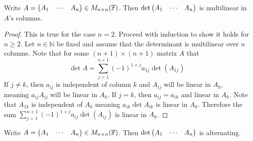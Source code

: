 \documentclass[../notes.tex]{subfiles}
\begin{document}
\begin{theorem}
    \label{thm:mlineardeterminant}
    Write $A = \mqty(A_1 & \cdots & A_n) \in M_{n\times n}(\mathbb{F})$. Then $\det \mqty(A_1 & \cdots & A_n)$ is multilinear in $A$'s columns.
\end{theorem}

\begin{proof}
    This is true for the case $n = 2$. Proceed with induction to show it holds for $n \geq 2$. Let $n \in \mathbb{N}$ be fixed and assume that the determinant is multilinear over $n$ columns. Note that for some $(n+1) \times (n+1)$ matrix $A$ that
    \[
        \det A = \sum_{j = 1}^{n+1} (-1)^{1 + j} a_{1j} \det(A_{1j})
    \]
    If $j \neq k$, then $a_{ij}$ is independent of column $k$ and $A_{ij}$ will be linear in $A_k$, meaning $a_{ij} A_{ij}$ will be linear in $A_k$. If $j = k$, then $a_{ij} = a_{ik}$ and linear in $A_k$. Note that $A_{1k}$ is independent of $A_k$ meaning $a_{ik} \det{A_{ik}}$ is linear in $A_k$. Therefore the sum $\sum_{j=1}^{n+1} (-1)^{1+j} a_{ij} \det(A_{ij})$ is linear in $A_k$.
\end{proof}

\begin{theorem}
    Write $A = \mqty(A_1 & \cdots & A_n) \in M_{n\times n}(\mathbb{F})$. Then $\det \mqty(A_1 & \cdots & A_n)$ is alternating.
\end{theorem}
\end{document}
